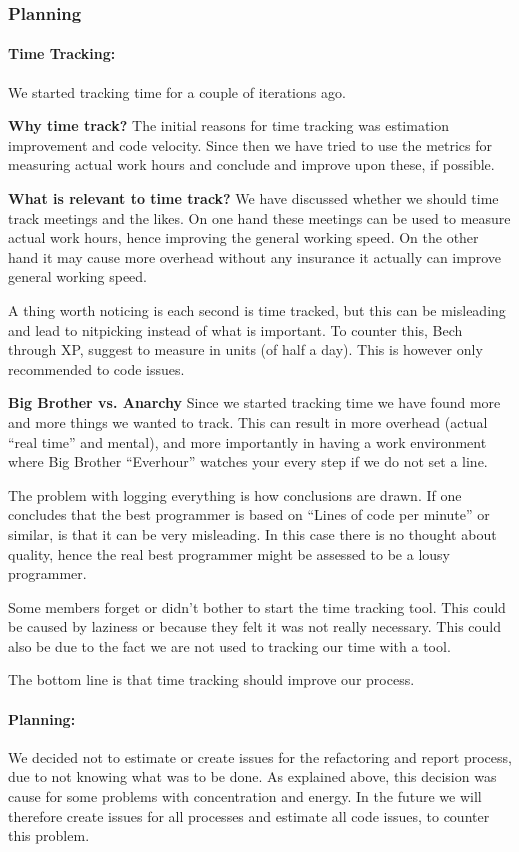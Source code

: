 \subsubsection{Planning}
\paragraph{Time Tracking:}
We started tracking time for a couple of iterations ago.

\textbf{Why time track?}
The initial reasons for time tracking was estimation improvement and code velocity.
Since then we have tried to use the metrics for measuring actual work hours and conclude and improve upon these, if possible.

\textbf{What is relevant to time track?}
We have discussed whether we should time track meetings and the likes. On one hand these meetings can be used to measure actual work hours, hence improving the general working speed. On the other hand it may cause more overhead without any insurance it actually can improve general working speed. 

A thing worth noticing is each second is time tracked, but this can be misleading and lead to nitpicking instead of what is important. To counter this, Bech through XP, suggest to measure in units (of half a day). This is however only recommended to code issues. 

\textbf{Big Brother vs. Anarchy}
Since we started tracking time we have found more and more things we wanted to track. This can result in more overhead (actual “real time” and mental), and more importantly in having a work environment where Big Brother “Everhour” watches your every step if we do not set a line.

The problem with logging everything is how conclusions are drawn. If one concludes that the best programmer is based on “Lines of code per minute” or similar, is that it can be very misleading. In this case there is no thought about quality, hence the real best programmer might be assessed to be a lousy programmer.

Some members forget or didn’t bother to start the time tracking tool. This could be caused by laziness or because they felt it was not really necessary. This could also be due to the fact we are not used to tracking our time with a tool.

The bottom line is that time tracking should improve our process.


\paragraph{Planning:}
We decided not to estimate or create issues for the refactoring and report process, due to not knowing what was to be done.\linebreak
As explained above, this decision was cause for some problems with concentration and energy.
In the future we will therefore create issues for all processes and estimate all code issues, to counter this problem.

